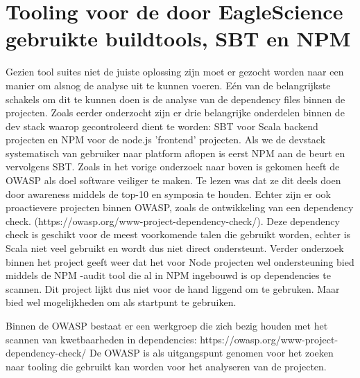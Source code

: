 \section{Tooling voor de door EagleScience gebruikte buildtools, SBT en NPM}
Gezien tool suites niet de juiste oplossing zijn moet er gezocht worden naar een manier om alsnog de analyse uit te kunnen voeren. Eén van de belangrijkste schakels om dit te kunnen doen is de analyse van de dependency files binnen de projecten. Zoals eerder onderzocht zijn er drie belangrijke onderdelen binnen de dev stack waarop gecontroleerd dient te worden: SBT voor Scala backend projecten en NPM voor de node.js 'frontend' projecten. Als we de dev\-stack systematisch van gebruiker naar platform aflopen is eerst NPM aan de beurt en vervolgens SBT. Zoals in het vorige onderzoek naar boven is gekomen heeft de OWASP als doel software veiliger te maken. Te lezen was dat ze dit deels doen door awareness middels de top-10 en symposia te houden. Echter zijn er ook proactievere projecten binnen OWASP, zoals de ontwikkeling van een dependency check. (https://owasp.org/www-project-dependency-check/). Deze dependency check is geschikt voor de meest voorkomende talen die gebruikt worden, echter is Scala niet veel gebruikt en wordt dus niet direct ondersteunt. Verder onderzoek binnen het project geeft weer dat het voor Node projecten wel ondersteuning bied middels de NPM -audit tool die al in NPM ingebouwd is op dependencies te scannen. Dit project lijkt dus niet voor de hand liggend om te gebruken. Maar bied wel mogelijkheden om als startpunt te gebruiken.

Binnen de OWASP bestaat er een werkgroep die zich bezig houden met het scannen van kwetbaarheden in dependencies: https://owasp.org/www-project-dependency-check/  De OWASP is als uitgangspunt genomen voor het zoeken naar tooling die gebruikt kan worden voor het analyseren van de projecten.


